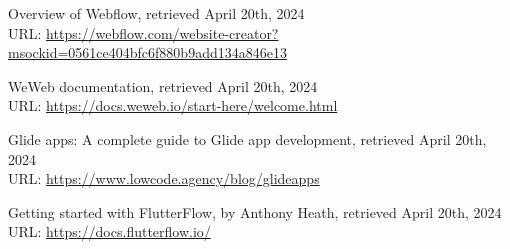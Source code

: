 \begin{thebibliography}{9}
Overview of Webflow, retrieved April 20th, 2024\\
URL: \url{https://webflow.com/website-creator?msockid=0561ce404bfc6f880b9add134a846e13}


WeWeb documentation, retrieved April 20th, 2024\\
URL: \url{https://docs.weweb.io/start-here/welcome.html}


Glide apps: A complete guide to Glide app development, retrieved April 20th, 2024\\
URL: \url{https://www.lowcode.agency/blog/glideapps}


Getting started with FlutterFlow, by Anthony Heath, retrieved April 20th, 2024\\
URL: \url{https://docs.flutterflow.io/}









\end{thebibliography} 

